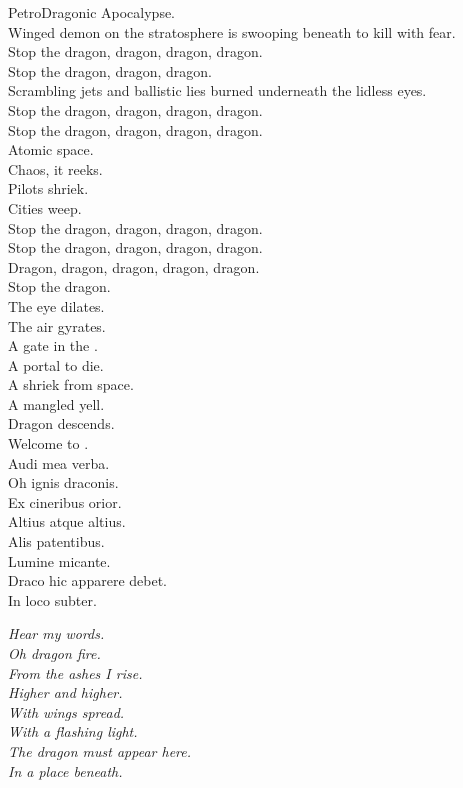 PetroDragonic Apocalypse. \\

Winged demon on the stratosphere is swooping beneath to kill with fear. \\
Stop the dragon, dragon, dragon, dragon. \\
Stop the dragon, dragon, dragon. \\
Scrambling jets and ballistic lies burned underneath the lidless eyes. \\
Stop the dragon, dragon, dragon, dragon. \\
Stop the dragon, dragon, dragon, dragon. \\
Atomic space. \\
Chaos, it reeks. \\
Pilots shriek. \\
Cities weep. \\
Stop the dragon, dragon, dragon, dragon. \\
Stop the dragon, dragon, dragon, dragon. \\
Dragon, dragon, dragon, dragon, dragon. \\
Stop the dragon. \\

The eye dilates. \\
The air gyrates. \\
A gate in the . \\
A portal to die. \\
A shriek from space. \\
A mangled yell. \\
Dragon descends. \\
Welcome to . \\

Audi mea verba. \\
Oh ignis draconis. \\
Ex cineribus orior. \\
Altius atque altius. \\
Alis patentibus. \\
Lumine micante. \\
Draco hic apparere debet. \\
In loco subter. \\


{\itshape%
Hear my words. \\
Oh dragon fire. \\
From the ashes I rise. \\
Higher and higher. \\
With wings spread. \\
With a flashing light. \\
The dragon must appear here. \\
In a place beneath. \\
}

